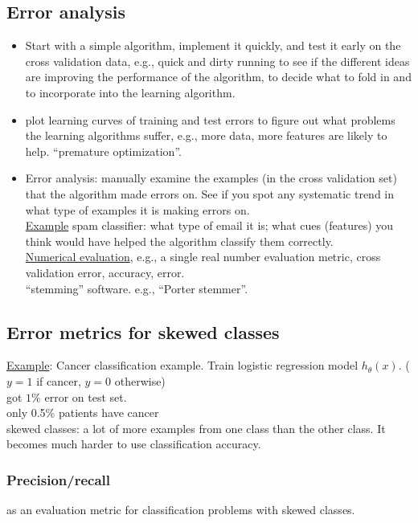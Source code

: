 %
\subsection{Error analysis}
\begin{itemize}
\item
Start with a simple algorithm, implement it quickly, and test it early on the cross validation data, e.g., quick and dirty running to see if the different ideas are improving the performance of the algorithm, to decide what to fold in and to incorporate into the learning algorithm.
\item
plot learning curves of training and test errors to figure out what problems the learning algorithms suffer, e.g., more data, more features are likely to help. ``premature optimization''.
\item
Error analysis: manually examine the examples (in the cross validation set) that the algorithm made errors on. See if you spot any systematic trend in what type of examples it is making errors on.\\
\underline{Example} spam classifier: what type of email it is; what cues (features) you think would have helped the algorithm classify them correctly.\\
\underline{Numerical evaluation}, e.g., a single real number evaluation metric, cross validation error, accuracy, error.\\
``stemming'' software. e.g., ``Porter stemmer''.
\end{itemize}

%
\subsection{Error metrics for skewed classes}
\underline{Example}: Cancer classification example. Train logistic regression model $h_\theta(x)$. ($y=1$ if cancer, $y=0$ otherwise)\\
got $1\%$ error on test set.\\
only 0.5\% patients have cancer\\
skewed classes: a lot of more examples from one class than the other class. It becomes much harder to use classification accuracy.\\

\subsubsection{Precision/recall} 
as an evaluation metric for classification problems with skewed classes.\\

